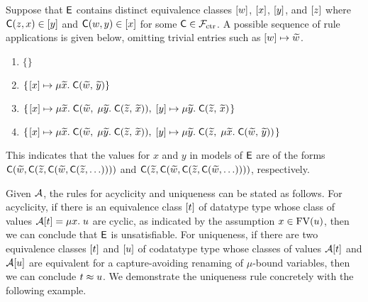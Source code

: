 \begin{example}
Suppose that $\mathsf{E}$ contains distinct equivalence classes $[w]$, $[x]$, $[y]$, and $[z]$
where $\textsf{C}(z,x) \in [y]$ and $\textsf{C}(w,y) \in [x]$ for some $\textsf{C} \in \mathcal{F}_{\mathrm{ctr}}$.
A possible sequence of  rule applications is given below, omitting
trivial entries such as $[w] \mapsto {\widetilde{w}}$.
%
\begin{enumerate}
\item \noindent{}$\{  \}$
\item \noindent{}$\{\vthinspace  \ec{x} \mapsto \mu {\Varec{x}}.\; \const{C}( {\Varec{w}},\, {\Varec{y}} ) \}$
\item \noindent{}$\{\vthinspace  \ec{x} \mapsto \mu {\Varec{x}}.\; \const{C}( {\Varec{w}},\; \mu {\Varec{y}}.\; \const{C}( {\Varec{z}},\, {\Varec{x}} ) ),\;
  \ec{y} \mapsto \mu {\Varec{y}}.\; \const{C}( {\Varec{z}},\, {\Varec{x}} ) \vthinspace\}$
\item \noindent{}$\{\vthinspace  \ec{x} \mapsto \mu {\Varec{x}}.\; \const{C}( {\Varec{w}},\; \mu {\Varec{y}}.\; \const{C}( {\Varec{z}},\, {\Varec{x}} ) ),\;
  \ec{y} \mapsto \mu {\Varec{y}}.\; \const{C}( {\Varec{z}},\; \mu {\Varec{x}}.\; \const{C}( {\Varec{w}},\, {\Varec{y}} ) ) \vthinspace\}$
\end{enumerate}
%
This indicates that the values for $x$ and $y$ in models of $\mathsf{E}$
are of the forms $\textsf{C}( {\widetilde{w}}, \textsf{C}( {\widetilde{z}}, \textsf{C}( {\widetilde{w}},\allowbreak \textsf{C}( {\widetilde{z}},\ldots ))))$
and $\textsf{C}( {\widetilde{z}}, \textsf{C}( {\widetilde{w}}, \textsf{C}( {\widetilde{z}}, \textsf{C}( {\widetilde{w}}, \ldots ))))$,
respectively. %
\xend
\end{example}

Given $\mathcal{A}$, the rules for acyclicity and uniqueness can be stated as follows.
For acyclicity, if there is an equivalence class $[t]$ of datatype type whose class of values $\mathcal{A} [t] = \mu x.\; u$ are cyclic,
as indicated by the assumption $x \in \mathrm{FV}( u )$,
then we can conclude that $\mathsf{E}$ is unsatisfiable.
For uniqueness, if there are two equivalence classes $[t]$ and $[u]$
of codatatype type whose classes of values $\mathcal{A} [t]$ and $\mathcal{A} [u]$ are equivalent for a capture-avoiding renaming of $\mu$-bound variables,
then we can conclude $t \approx u$.
We demonstrate the uniqueness rule concretely with the following example.

